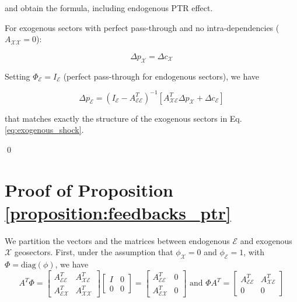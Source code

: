 \documentclass{article}
\begin{document}
\noindent and obtain the formula, including endogenous PTR effect. 

\vspace{0.1cm}

For exogenous sectors with perfect pass-through and no intra-dependencies ($A_{\mathcal{XX}} = 0$):

\begin{equation*}
    \Delta p_{\mathcal{X}} = \Delta c_{\mathcal{X}}
\end{equation*}

Setting $\Phi_{\mathcal{E}} = I_{\mathcal{E}}$ (perfect pass-through for endogenous sectors), we have

\begin{equation*}
    \Delta p_{\mathcal{E}} = \left(I_{\mathcal{E}} - A_{\mathcal{EE}}^T\right)^{-1} \left[A_{\mathcal{XE}}^T \Delta p_{\mathcal{X}} + \Delta c_{\mathcal{E}}\right]
\end{equation*}

that matches exactly the structure of the exogenous sectors in Eq. \eqref{eq:exogenous_shock}. 

\qed

\section{Proof of Proposition \ref{proposition:feedbacks_ptr}}
\label{app:proof_feedbacks_ptr_second}

We partition the vectors and the matrices between endogenous $\mathcal{E}$ and exogenous $\mathcal{X}$ geosectors. First, under the assumption that $\phi_\mathcal{X}=0$ and $\phi_\mathcal{E}=1$, with $\Phi=\text{diag}(\phi)$, we have
\[
A^T \Phi = \begin{bmatrix}
A_{\mathcal{EE}}^T & A_{\mathcal{XE}}^T \\
A_{\mathcal{EX}}^T & A_{\mathcal{XX}}^T
\end{bmatrix}
\begin{bmatrix}
I & 0 \\
0 & 0
\end{bmatrix}
=
\begin{bmatrix}
A_{\mathcal{EE}}^T & 0 \\
A_{\mathcal{EX}}^T & 0
\end{bmatrix} \text{ and } \Phi A^T = \begin{bmatrix}
A_{\mathcal{EE}}^T & A_{\mathcal{XE}}^T \\
0 & 0
\end{bmatrix}
\]
\end{document}
